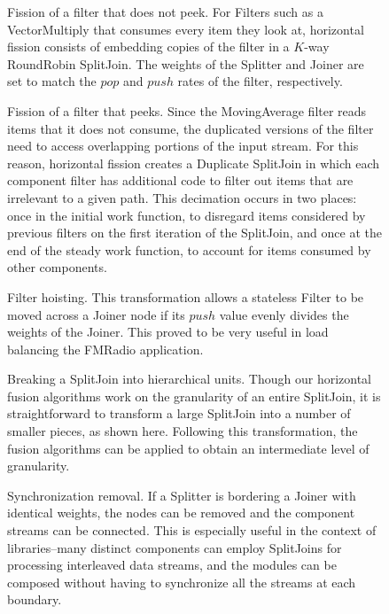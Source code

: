 \begin{figure}
\centering
{}
\caption{\protect\small Fission of a filter that does not peek.  For
Filters such as a VectorMultiply that consumes every item they look
at, horizontal fission consists of embedding copies of the filter in a
$K$-way RoundRobin SplitJoin.  The weights of the Splitter and Joiner
are set to match the $pop$ and $push$ rates of the filter,
respectively.  \protect\label{fig:fission-nopeek}}
\end{figure}

\begin{figure}
\centering
{}
\caption{\protect\small Fission of a filter that peeks.  Since the
MovingAverage filter reads items that it does not consume, the
duplicated versions of the filter need to access overlapping portions
of the input stream.  For this reason, horizontal fission creates a
Duplicate SplitJoin in which each component filter has additional code
to filter out items that are irrelevant to a given path.  This
decimation occurs in two places: once in the initial work function, to
disregard items considered by previous filters on the first iteration
of the SplitJoin, and once at the end of the steady work function, to
account for items consumed by other components.
\protect\label{fig:fission-peek}}
\end{figure}

\begin{figure}
\centering
{}
\caption{\protect\small Filter hoisting.  This transformation allows a
stateless Filter to be moved across a Joiner node if its $push$ value
evenly divides the weights of the Joiner.  This proved to be very
useful in load balancing the FMRadio application.
\protect\label{fig:filter-hoisting}}
\vspace{12pt}
\caption{\protect\small Breaking a SplitJoin into hierarchical units.
Though our horizontal fusion algorithms work on the granularity of an
entire SplitJoin, it is straightforward to transform a large SplitJoin
into a number of smaller pieces, as shown here.  Following this
transformation, the fusion algorithms can be applied to obtain an
intermediate level of granularity.
\protect\label{fig:splitjoin-split}}
\vspace{12pt}
\caption{\protect\small Synchronization removal.  If a Splitter is
bordering a Joiner with identical weights, the nodes can be removed
and the component streams can be connected.  This is especially useful
in the context of libraries--many distinct components can employ
SplitJoins for processing interleaved data streams, and the modules
can be composed without having to synchronize all the streams at each
boundary.  \protect\label{fig:sync-removal}}
\vspace{-6pt}
\end{figure}

